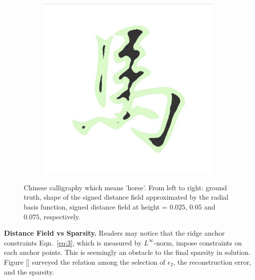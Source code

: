 \documentclass[review]{acmsiggraph}
\begin{document}
\begin{figure}
\begin{subfigure}[b]{0.18\linewidth}
        \end{subfigure}
~
		\begin{subfigure}[b]{0.18\linewidth}
                \centering
                \includegraphics[width=\textwidth]{images/horse/horse-contour-0d75.pdf}
        \end{subfigure}
        \caption{Chinese calligraphy which means 'horse'. From left to right: ground truth, shape of the signed distance field approximated by the radial basis function, signed distance field at height = $0.025$, $0.05$ and $0.075$, respectively. }
				\label{fig:horse}
\end{figure}

\textbf{Distance Field vs Sparsity. }
Readers may notice that the ridge anchor constraints Eqn.~\ref{eq:3}, which is measured by $L^{\infty}$-norm, impose constraints on each anchor points. This is seemingly an obstacle to the final sparsity in solution. Figure [] surveyed the relation among the selection of $\epsilon_2$, the reconstruction error, and the sparsity. 
\end{document}
